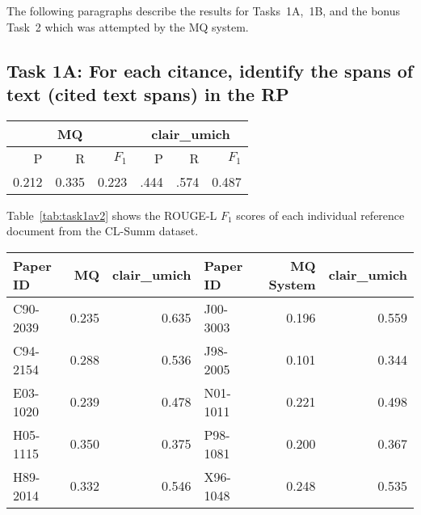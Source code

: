\documentclass[11pt]{article}
\begin{document}
The following paragraphs describe the results for Tasks~1A,~1B, and the
bonus Task~2 which was attempted by the MQ system.

\subsection{Task 1A: For each citance, identify the spans of text (cited text spans) in the RP}

\begin{table*}
\centering
	\begin{tabular}{|r|r|r|r|r|r|}
	\hline
	\multicolumn{3}{|c|}{MQ} & \multicolumn{3}{|c|}{clair\_umich}\\
	\hline
	P & R & $F_1$ & P & R & $F_1$\\
	\hline
 	0.212 & 0.335 & 0.223 & .444 & .574 & 0.487\\
	\hline
	\end{tabular}
\caption{Task~1A performance for the participating systems expressed as ROUGE-L score
 averaged over all topics.}
\label{tab:task1a}
\end{table*}

Table~\ref{tab:task1av2} shows the ROUGE-L $F_1$ scores of each individual 
reference document from the CL-Summ dataset.

\begin{table*}
  \centering
  \begin{tabular}{|l|r|r||l|r|r|}
  	\hline
	Paper ID & MQ  & clair\_umich & Paper ID & MQ System & clair\_umich \\
	\hline
	C90-2039 & 0.235 & 0.635 &	J00-3003 & 0.196 & 0.559\\
	C94-2154 & 0.288 & 0.536 &	J98-2005 & 0.101 & 0.344\\
	E03-1020 & 0.239 & 0.478 &	N01-1011 & 0.221 & 0.498\\
	H05-1115 & 0.350 & 0.375 &	P98-1081 & 0.200 & 0.367\\
	H89-2014 & 0.332 & 0.546 &	X96-1048 & 0.248 & 0.535\\
	\hline
  \end{tabular}
\caption{Task~1A ROUGE-L F1 scores for individual topics.}
\label{tab:task1av2}
\end{table*}
\end{document}
